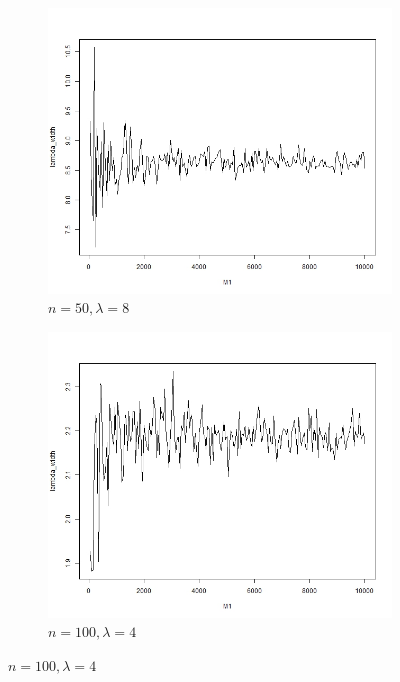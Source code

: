 \documentclass{article}
\begin{document}
\begin{figure}[!htb]
    	\begin{subfigure}[b]{0.5\textwidth}
    	\includegraphics[width = \textwidth]{./Codes/lambda_50_8.jpg}
    	\caption{$n = 50, \lambda = 8$}
    	\end{subfigure}%
    	\begin{subfigure}[b]{0.5\textwidth}
    	\includegraphics[width = \textwidth]{./Codes/lambda_100_4.jpg}
    	\caption{$n = 100, \lambda = 4$}
    	\end{subfigure}%
    	

\end{figure}
\end{document}
